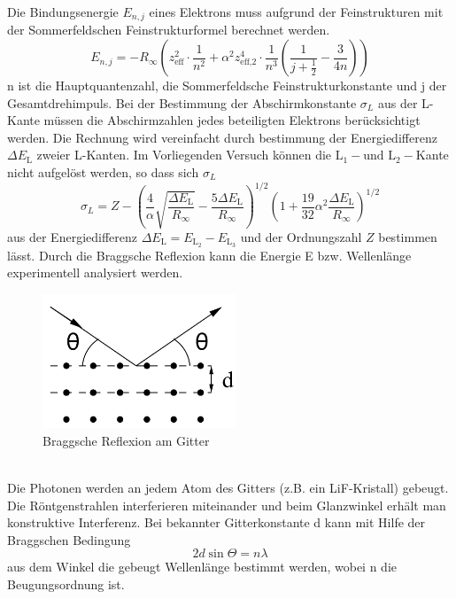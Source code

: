 \noindent
Die Bindungsenergie $E_{n,j}$ eines Elektrons muss aufgrund der Feinstrukturen mit der Sommerfeldschen Feinstrukturformel berechnet werden.
\begin{equation}
    E_{n,j} = -R_{\infty}\left(z_{\text{eff}}^2 \cdot \frac{1}{n^2} + \alpha^2 z_{\text{eff,2}}^4 \cdot \frac{1}{n^3} \left( \frac{1}{j + \frac{1}{2}} - \frac{3}{4n}\right)\right)
    \label{eqn:gl3}
\end{equation}
n ist die Hauptquantenzahl, \alpha die Sommerfeldsche Feinstrukturkonstante und j der Gesamtdrehimpuls.
Bei der Bestimmung der Abschirmkonstante ${\sigma}_L$ aus der L-Kante müssen die Abschirmzahlen jedes beteiligten Elektrons berücksichtigt werden.
Die Rechnung wird vereinfacht durch bestimmung der Energiedifferenz $\Delta E_{\text{L}}$ zweier L-Kanten.
Im Vorliegenden Versuch können die $\text{L}_1- \text{und L}_2-$Kante nicht aufgelöst werden, so dass sich ${\sigma}_L$
\begin{equation}
    {\sigma}_L = Z - \left(\frac{4}{\alpha}\sqrt{\frac{\Delta E_{\text{L}}}{R_{\infty}}} - \frac{5 \Delta E_{\text{L}}}{R_{\infty}}\right)^{1/2}\left(1 + \frac{19}{32}\alpha^2\frac{\Delta E_{\text{L}}}{R_{\infty}}\right)^{1/2}
    \label{eqn:gl4}
\end{equation}
aus der Energiedifferenz $\Delta E_{\text{L}} = E_{\text{$\text{L}_2$}} - E_{\text{$\text{L}_3$}}$ und der Ordnungszahl $Z$ bestimmen lässt.
Durch die Braggsche Reflexion kann die Energie E bzw. Wellenlänge \lambda experimentell analysiert werden.
\begin{figure}
    \centering
    \includegraphics[height=4.0cm]{data/abb3.jpg}
    \caption{Braggsche Reflexion am Gitter \cite{V602}}
    \label{fig:abb3}
\end{figure} \\
\noindent
Die Photonen werden an jedem Atom des Gitters (z.B. ein LiF-Kristall) gebeugt.
Die Röntgenstrahlen interferieren miteinander und beim Glanzwinkel \Theta erhält man konstruktive Interferenz.
Bei bekannter Gitterkonstante d kann mit Hilfe der Braggschen Bedingung
\begin{equation}
    2 d \sin{\Theta} = n \lambda
\end{equation}
aus dem Winkel \Theta die gebeugt Wellenlänge \lambda bestimmt werden, wobei n die Beugungsordnung ist.

